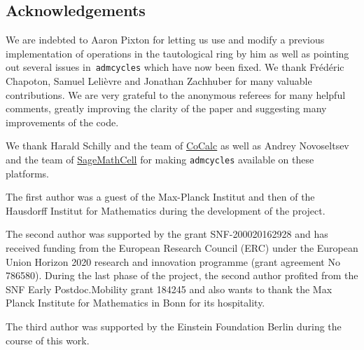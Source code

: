 \documentclass[11pt]{article}
\newcommand{\admcycles}{\texttt{admcycles}}
\begin{document}

\subsection*{Acknowledgements}
We are indebted to Aaron Pixton for letting us use and modify a previous implementation of operations in the tautological ring by him as well as pointing out several issues in~\admcycles{} which have now been fixed. We thank Fr\'ed\'eric Chapoton, Samuel Leli\`{e}vre  and Jonathan Zachhuber for many valuable contributions. We are very grateful to the anonymous referees for many helpful comments, greatly improving the clarity of the paper and suggesting many improvements of the code. 

We thank Harald Schilly and the team of \href{https://cocalc.com/}{CoCalc} as well as Andrey Novoseltsev and the team of \href{https://sagecell.sagemath.org/}{SageMathCell} for making \admcycles{} available on these platforms.

The first author was a guest of the Max-Planck Institut and then of the Hausdorff Institut for Mathematics during the development of the project.

The second author was
supported by the grant SNF-200020162928 and has received funding from the European Research Council (ERC)
under the European Union Horizon 2020 research and innovation programme
(grant agreement No 786580). During the last phase of the project, the second author profited from the SNF Early Postdoc.Mobility grant 184245 and also wants to thank the Max Planck Institute for Mathematics in Bonn for its hospitality.

The third author was supported by the Einstein Foundation Berlin during the course of this work.
\end{document}
